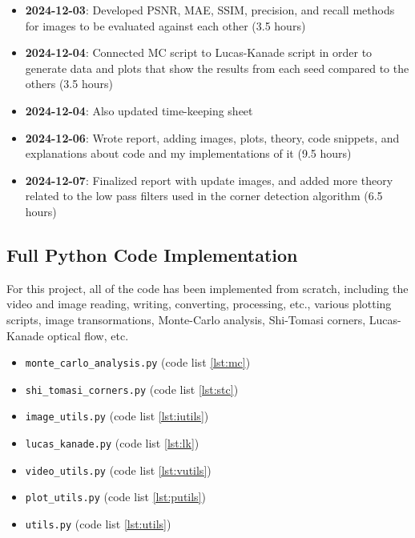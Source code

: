\documentclass[11pt, conference, letterpaper]{IEEEtran}
\begin{document}
\begin{itemize}
    \item \textbf{2024-12-03}: Developed PSNR, MAE, SSIM, precision, and recall methods for images to be evaluated against each other (3.5 hours)
    \item \textbf{2024-12-04}: Connected MC script to Lucas-Kanade script in order to generate data and plots that show the results from each seed compared to the others (3.5 hours)
    \item \textbf{2024-12-04}: Also updated time-keeping sheet
    \item \textbf{2024-12-06}: Wrote report, adding images, plots, theory, code snippets, and explanations about code and my implementations of it (9.5 hours)
    \item \textbf{2024-12-07}: Finalized report with update images, and added more theory related to the low pass filters used in the corner detection algorithm (6.5 hours)
\end{itemize}
\bigskip

\subsection{Full Python Code Implementation}
For this project, all of the code has been implemented from scratch, including the video and image reading, writing, converting, processing, etc., various plotting scripts, image transormations, Monte-Carlo analysis, Shi-Tomasi corners, Lucas-Kanade optical flow, etc.

\begin{itemize}
    \item \texttt{monte\_carlo\_analysis.py} (code list \ref{lst:mc})
    \item \texttt{shi\_tomasi\_corners.py} (code list \ref{lst:stc})
    \item \texttt{image\_utils.py} (code list \ref{lst:iutils})
    \item \texttt{lucas\_kanade.py} (code list \ref{lst:lk})
    \item \texttt{video\_utils.py} (code list \ref{lst:vutils})
    \item \texttt{plot\_utils.py} (code list \ref{lst:putils})
    \item \texttt{utils.py} (code list \ref{lst:utils})
\end{itemize}
\end{document}
